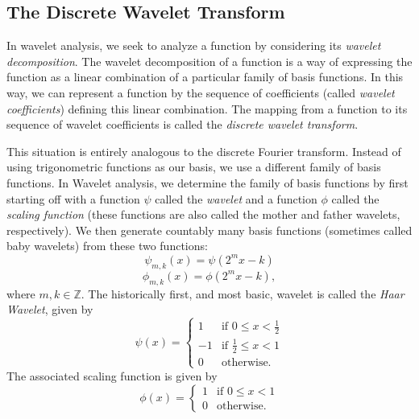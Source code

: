 

\subsection*{The Discrete Wavelet Transform}
In wavelet analysis, we seek to analyze a function by considering its \emph{wavelet decomposition}.
The wavelet decomposition of a function is a way of expressing the function as a linear combination
of a particular family of basis functions.
In this way, we can represent a function by the sequence of coefficients (called
\emph{wavelet coefficients}) defining this linear combination.
The mapping from a function to its sequence of wavelet coefficients is called the \emph{discrete
wavelet transform}.

This situation is entirely analogous to the discrete Fourier transform. Instead of using trigonometric functions
as our basis, we use a different family
of basis functions. In Wavelet analysis, we determine the family of basis functions by first starting
off with a function $\psi$ called the \emph{wavelet} and a function $\phi$ called the \emph{scaling function}
(these functions are also called the mother and father wavelets, respectively). We then generate
countably many basis functions (sometimes called baby wavelets) from these two functions:
\begin{equation*}
\psi_{m,k}(x) = \psi(2^mx - k)
\end{equation*}
\begin{equation*}
\phi_{m,k}(x) = \phi(2^mx - k),
\end{equation*}
where $m,k \in \mathbb{Z}$.
The historically first, and most basic, wavelet is called the \emph{Haar Wavelet},
given by
\[
\psi(x) =
 \begin{cases}
  1 & \text{if } 0 \leq x < \frac{1}{2} \\
  -1 & \text{if } \frac{1}{2} \leq x < 1 \\
  0 & \text{otherwise.}
 \end{cases}
\]
The associated scaling function is given by
\[
\phi(x) =
 \begin{cases}
 1 & \text{if } 0 \leq x < 1 \\
 0 & \text{otherwise.}
 \end{cases}
\]

